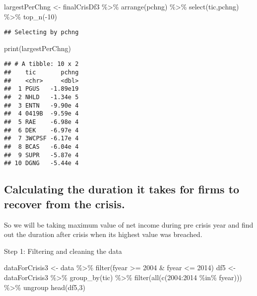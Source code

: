 \documentclass[
]{article}
\newenvironment{Shaded}{\begin{snugshade}}{\end{snugshade}}
\newcommand{\DecValTok}[1]{\textcolor[rgb]{0.00,0.00,0.81}{#1}}
\newcommand{\FunctionTok}[1]{\textcolor[rgb]{0.00,0.00,0.00}{#1}}
\newcommand{\NormalTok}[1]{#1}
\newcommand{\OtherTok}[1]{\textcolor[rgb]{0.56,0.35,0.01}{#1}}
\newcommand{\SpecialCharTok}[1]{\textcolor[rgb]{0.00,0.00,0.00}{#1}}
\begin{document}
\begin{Shaded}
\begin{Highlighting}[]
\NormalTok{largestPerChng }\OtherTok{\textless{}{-}}\NormalTok{ finalCrisDf3 }\SpecialCharTok{\%\textgreater{}\%} \FunctionTok{arrange}\NormalTok{(pchng) }\SpecialCharTok{\%\textgreater{}\%} \FunctionTok{select}\NormalTok{(tic,pchng) }\SpecialCharTok{\%\textgreater{}\%} \FunctionTok{top\_n}\NormalTok{(}\SpecialCharTok{{-}}\DecValTok{10}\NormalTok{)}
\end{Highlighting}
\end{Shaded}

\begin{verbatim}
## Selecting by pchng
\end{verbatim}

\begin{Shaded}
\begin{Highlighting}[]
\FunctionTok{print}\NormalTok{(largestPerChng)}
\end{Highlighting}
\end{Shaded}

\begin{verbatim}
## # A tibble: 10 x 2
##    tic       pchng
##    <chr>     <dbl>
##  1 PGUS   -1.89e19
##  2 NHLD   -1.34e 5
##  3 ENTN   -9.90e 4
##  4 0419B  -9.59e 4
##  5 RAE    -6.98e 4
##  6 DEK    -6.97e 4
##  7 3WCPSF -6.17e 4
##  8 BCAS   -6.04e 4
##  9 SUPR   -5.87e 4
## 10 DGNG   -5.44e 4
\end{verbatim}

\hypertarget{calculating-the-duration-it-takes-for-firms-to-recover-from-the-crisis.}{%
\subsection{Calculating the duration it takes for firms to recover from
the
crisis.}\label{calculating-the-duration-it-takes-for-firms-to-recover-from-the-crisis.}}

So we will be taking maximum value of net income during pre crisis year
and find out the duration after crisis when its highest value was
breached.

Step 1: Filtering and cleaning the data

\begin{Shaded}
\begin{Highlighting}[]
\NormalTok{dataForCrisis3 }\OtherTok{\textless{}{-}}\NormalTok{ data }\SpecialCharTok{\%\textgreater{}\%} \FunctionTok{filter}\NormalTok{(fyear }\SpecialCharTok{\textgreater{}=} \DecValTok{2004} \SpecialCharTok{\&}\NormalTok{ fyear }\SpecialCharTok{\textless{}=} \DecValTok{2014}\NormalTok{)}
\NormalTok{df5 }\OtherTok{\textless{}{-}}\NormalTok{ dataForCrisis3 }\SpecialCharTok{\%\textgreater{}\%} \FunctionTok{group\_by}\NormalTok{(tic) }\SpecialCharTok{\%\textgreater{}\%} \FunctionTok{filter}\NormalTok{(}\FunctionTok{all}\NormalTok{(}\FunctionTok{c}\NormalTok{(}\DecValTok{2004}\SpecialCharTok{:}\DecValTok{2014} \SpecialCharTok{\%in\%}\NormalTok{ fyear))) }\SpecialCharTok{\%\textgreater{}\%}\NormalTok{ ungroup}
\FunctionTok{head}\NormalTok{(df5,}\DecValTok{3}\NormalTok{)}
\end{Highlighting}
\end{Shaded}
\end{document}
